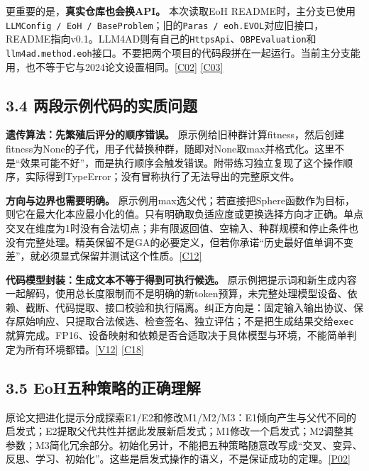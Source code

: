 更重要的是，\textbf{真实仓库也会换API。} 本次读取EoH
README时，主分支已使用\texttt{LLMConfig\ /\ EoH\ /\ BaseProblem}；旧的\texttt{Paras\ /\ eoh.EVOL}对应旧接口，README指向v0.1。LLM4AD则有自己的\texttt{HttpsApi}、\texttt{OBPEvaluation}和\texttt{llm4ad.method.eoh}接口。不要把两个项目的代码段拼在一起运行。当前主分支能用，也不等于它与2024论文设置相同。\href{https://github.com/FeiLiu36/EoH}{{[}C02{]}}
\href{https://github.com/Optima-CityU/LLM4AD}{{[}C03{]}}

\subsection{3.4
两段示例代码的实质问题}\label{ux4e24ux6bb5ux793aux4f8bux4ee3ux7801ux7684ux5b9eux8d28ux95eeux9898}

\textbf{遗传算法：先繁殖后评分的顺序错误。}
原示例给旧种群计算fitness，然后创建fitness为None的子代，用子代替换种群，随即对None取max并格式化。这里不是``效果可能不好''，而是执行顺序会触发错误。附带练习独立复现了这个操作顺序，实际得到TypeError；没有冒称执行了无法导出的完整原文件。

\textbf{方向与边界也需要明确。}
原示例用max选父代；若直接把Sphere函数作为目标，则它在最大化本应最小化的值。只有明确取负适应度或更换选择方向才正确。单点交叉在维度为1时没有合法切点；非有限返回值、空输入、种群规模和停止条件也没有完整处理。精英保留不是GA的必要定义，但若你承诺``历史最好值单调不变差''，就必须显式保留并测试这个性质。\href{https://deap.readthedocs.io/en/master/tutorials/basic/part2.html}{{[}C12{]}}

\textbf{代码模型封装：生成文本不等于得到可执行候选。}
原示例把提示词和新生成内容一起解码，使用总长度限制而不是明确的新token预算，未完整处理模型设备、依赖、截断、代码提取、接口校验和执行隔离。纠正方向是：固定输入输出协议、保存原始响应、只提取合法候选、检查签名、独立评估；不是把生成结果交给\texttt{exec}就算完成。FP16、设备映射和依赖是否合适取决于具体模型与环境，不能简单判定为所有环境都错。\href{https://huggingface.co/learn/llm-course/zh-CN/chapter1/1}{{[}V12{]}}
\href{https://github.com/openai/human-eval}{{[}C18{]}}

\subsection{3.5
EoH五种策略的正确理解}\label{eohux4e94ux79cdux7b56ux7565ux7684ux6b63ux786eux7406ux89e3}

原论文把进化提示分成探索E1/E2和修改M1/M2/M3：E1倾向产生与父代不同的启发式；E2提取父代共性并据此发展新启发式；M1修改一个启发式；M2调整其参数；M3简化冗余部分。初始化另计，不能把五种策略随意改写成``交叉、变异、反思、学习、初始化''。这些是启发式操作的语义，不是保证成功的定理。\href{https://arxiv.org/abs/2401.02051}{{[}P02{]}}


